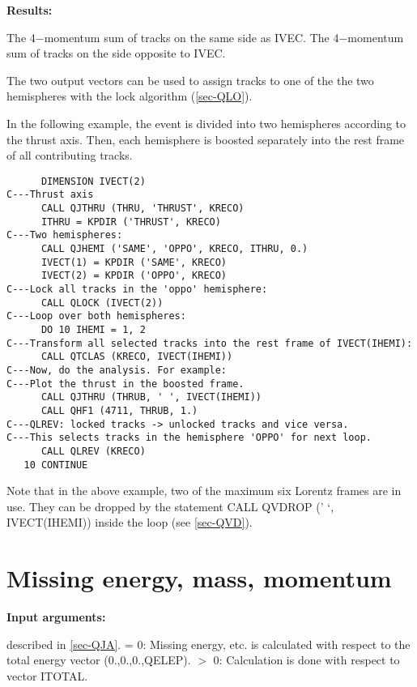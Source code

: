 {\bf Results:}
\begin{indentlist}{ 3.00cm}{ 3.25cm}
The 4$-$momentum sum of tracks on the same
side as IVEC.
The 4$-$momentum sum of tracks on the side opposite to IVEC.
\end{indentlist}
\par
The two output vectors can be used to assign tracks to one of the
the two hemispheres with the lock algorithm
(\ref{sec-QLO}).
\par In the following example, the event is divided into two
hemispheres according to the thrust axis. Then, each hemisphere is
boosted separately into the rest frame of all contributing tracks.
\begin{verbatim}
      DIMENSION IVECT(2)
C---Thrust axis
      CALL QJTHRU (THRU, 'THRUST', KRECO)
      ITHRU = KPDIR ('THRUST', KRECO)
C---Two hemispheres:
      CALL QJHEMI ('SAME', 'OPPO', KRECO, ITHRU, 0.)
      IVECT(1) = KPDIR ('SAME', KRECO)
      IVECT(2) = KPDIR ('OPPO', KRECO)
C---Lock all tracks in the 'oppo' hemisphere:
      CALL QLOCK (IVECT(2))
C---Loop over both hemispheres:
      DO 10 IHEMI = 1, 2
C---Transform all selected tracks into the rest frame of IVECT(IHEMI):
      CALL QTCLAS (KRECO, IVECT(IHEMI))
C---Now, do the analysis. For example:
C---Plot the thrust in the boosted frame.
      CALL QJTHRU (THRUB, ' ', IVECT(IHEMI))
      CALL QHF1 (4711, THRUB, 1.)
C---QLREV: locked tracks -> unlocked tracks and vice versa.
C---This selects tracks in the hemisphere 'OPPO' for next loop.
      CALL QLREV (KRECO)
   10 CONTINUE
\end{verbatim}
Note that in the above example, two of the maximum six Lorentz frames
are in use. They can be dropped by the statement
CALL QVDROP (' `, IVECT(IHEMI))
inside the loop (see \ref{sec-QVD}).
 
\section{\label{sec-QJME}Missing energy, mass, momentum}
\par
{}
\par
\par
{\bf Input arguments:}
\begin{indentlist}{ 4.25cm}{ 4.50cm}
described in \ref{sec-QJA}.
= 0: Missing energy, etc. is calculated with respect to
the total energy vector (0.,0.,0.,QELEP).
$>$ 0: Calculation is done with respect to vector ITOTAL.
\end{indentlist}
 
